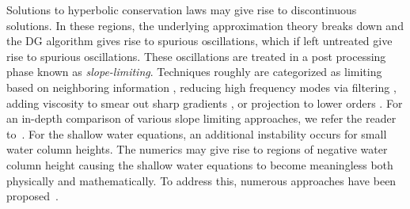 Solutions to hyperbolic conservation laws may give rise to discontinuous solutions. In these regions, the underlying approximation theory breaks down and the DG algorithm gives rise to spurious oscillations, which if left untreated give rise to spurious oscillations. These oscillations are treated in a post processing phase known as {\em slope-limiting}. Techniques roughly are categorized as limiting based on neighboring information \cite{Cockburn1989b,Kuzmin2010,Bell1988}, reducing high frequency modes via filtering \cite{Hesthaven08,Maday1993,Meister2011}, adding viscosity to smear out sharp gradients \cite{Guermond2011,Persson2006}, or projection to lower orders \cite{Dumbser2016}. For an in-depth comparison of various slope limiting approaches, we refer the reader to~\cite{Michoski2015}. For the shallow water equations, an additional instability occurs for small water column heights. The numerics may give rise to regions of negative water column height causing the shallow water equations to become meaningless both physically and mathematically. To address this, numerous approaches have been proposed~\cite{Bunya2009,Gandham2015,Casulli2009,Vater2015,Xing2013,Rannabauer2018}.